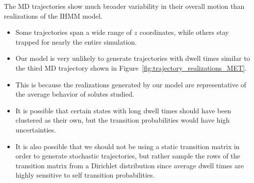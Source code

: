 \documentclass{article}
\begin{document}
  The MD trajectories show much broader variability in their overall motion than realizations
  of the IHMM model. 
  \begin{itemize}
  		\item Some trajectories span a wide range of $z$ coordinates, while others stay
  		trapped for nearly the entire simulation.
  		\item Our model is very unlikely to generate trajectories with dwell times similar to 
  		the third MD trajectory shown in Figure~\ref{fig:trajectory_realizations_MET}.
        \item This is because the realizations generated by our model are representative
        of the average behavior of solutes studied.
        \item It is possible that certain states with long dwell times should have been
        clustered as their own, but the transition probabilities would have high uncertainties.
        \item It is also possible that we should not be using a static transition matrix in 
        order to generate stochastic trajectories, but rather sample the rows of the transition
        matrix from a Dirichlet distribution since average dwell times are highly sensitive to
        self transition probabilities.
  \end{itemize}
\end{document}
